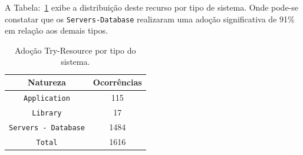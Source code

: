 A Tabela:~\ref{tab:adocaoResource} exibe a distribuição deste recurso por tipo de sistema. Onde pode-se constatar que os \texttt{Servers-Database} realizaram uma adoção significativa de \num{91}\% em relação aos demais tipos.

\begin{table}[h]
	\centering
	\caption{Adoção Try-Resource por tipo do sistema.}
	\begin{tabular}{cc}
		\hline
		Natureza & Ocorrências \\ 
		\hline \hline
		\texttt{Application} & 115 \\ 
		\texttt{Library} & 17 \\ 
		\texttt{Servers - Database} & 1484 \\ \hline
		\texttt{Total} & 1616 \\ \hline
	\end{tabular}
	\label{tab:adocaoResource} %
\end{table}


